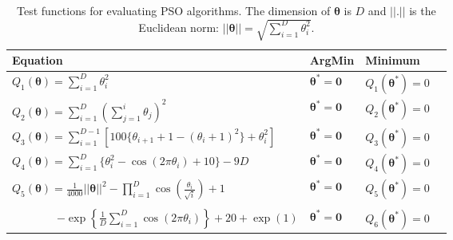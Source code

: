 \documentclass[cmbright]{staauth}
\begin{document}
\begin{table}[h]
\centering
\begin{tabular}{llll}
 Equation & ArgMin & Minimum \\\hline
 $Q_1(\bm{\theta}) = \sum_{i=1}^D\theta_i^2$ & $\bm{\theta}^* = \bm{0}$ & $Q_1(\bm{\theta}^*) = 0$  \\
 $Q_2(\bm{\theta}) = \sum_{i=1}^D\left(\sum_{j=1}^i \theta_j\right)^2 $ & $\bm{\theta}^* = \bm{0}$ & $Q_2(\bm{\theta}^*) = 0$ \\
 $Q_3(\bm{\theta}) = \sum_{i=1}^{D-1}\left[100\{\theta_{i+1} + 1 - (\theta_i + 1)^2\} + \theta_i^2\right]$ & $\bm{\theta}^* = \bm{0}$ & $Q_3(\bm{\theta}^*) = 0$ \\
 $Q_4(\bm{\theta}) = \sum_{i=1}^D\{\theta_i^2 - \cos(2\pi \theta_i) + 10\} - 9D$ & $\bm{\theta}^*=\bm{0}$ & $Q_4(\bm{\theta}^*) = 0$ \\
 $Q_5(\bm{\theta}) = \frac{1}{4000}||\bm{\theta}||^2 - \prod_{i=1}^D\cos\left(\frac{\theta_i}{\sqrt{i}}\right) + 1$ & $\bm{\theta}^* = \bm{0}$ & $Q_5(\bm{\theta}^*) = 0$ \\
 \shortstack[l]{$Q_6(\bm{\theta}) = -20\exp\left(-0.2\sqrt{\frac{1}{D}||\bm{\theta}||}\right)$ \\ \ \ \ \ \ \ \ \ $- \exp\left\{\frac{1}{D}\sum_{i=1}^D\cos(2\pi \theta_i)\right\} + 20 + \exp(1)$} & $\bm{\theta}^* = \bm{0}$ & $Q_6(\bm{\theta}^*) = 0$ \\\hline
\end{tabular}
\caption{Test functions for evaluating PSO algorithms. The dimension of $\bm{\theta}$ is $D$ and $||.||$ is the Euclidean norm: $||\bm{\theta}|| = \sqrt{\sum_{i=1}^D\theta_i^2}$.}
\label{tab:testfuns}
\end{table}
\end{document}
